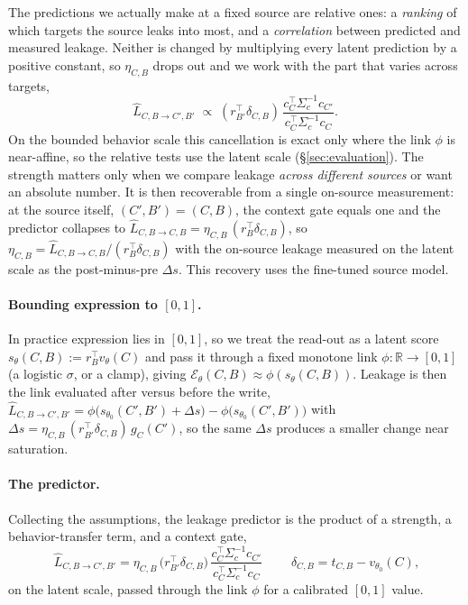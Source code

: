 \documentclass[11pt]{article}
\theoremstyle{definition}
\theoremstyle{definition}
\theoremstyle{assumptionstyle}
\newcounter{prediction}
\newcommand{\Expr}{\mathcal{E}}        %
\newcommand{\R}{\mathbb{R}}
\newcommand{\disp}{\delta_{C,B}}
\begin{document}
The predictions we actually make at a fixed source are relative ones: a \emph{ranking} of
which targets the source leaks into most, and a \emph{correlation} between predicted and
measured leakage. Neither is changed by multiplying every latent prediction by a positive
constant, so \(\eta_{C,B}\) drops out and we work with the part that varies across
targets,
\[
\widehat L_{C,B\to C',B'}
\;\propto\;
(r_{B'}^\top \disp)\,
\frac{c_{C}^\top \Sigma_c^{-1}c_{C'}}{c_{C}^\top \Sigma_c^{-1}c_{C}}.
\]
On the bounded behavior scale this cancellation is exact only where the link $\phi$ is near-affine, so the relative tests use the latent scale (\S\ref{sec:evaluation}). The strength matters only when we compare leakage \emph{across different sources} or want
an absolute number. It is then recoverable from a single on-source measurement: at the source
itself, \((C',B')=(C,B)\), the context gate equals one and the predictor collapses
to \(\widehat L_{C,B\to C,B}=\eta_{C,B}\,(r_B^\top\disp)\), so
\(\eta_{C,B}=\widehat L_{C,B\to C,B}/(r_B^\top\disp)\) with the on-source leakage
measured on the latent scale as the post-minus-pre $\Delta s$. This recovery uses the fine-tuned source model.


\paragraph{Bounding expression to $[0,1]$.} In practice expression lies in
$[0,1]$, so we treat the read-out as a latent score
$s_\theta(C,B):=r_B^\top v_\theta(C)$ and pass it through a fixed monotone
link $\phi:\R\to[0,1]$ (a logistic $\sigma$, or a clamp), giving
$\Expr_\theta(C,B)\approx\phi(s_\theta(C,B))$. Leakage is then the link
evaluated after versus before the write,
$\widehat L_{C,B\to C',B'}=\phi\!\big(s_{\theta_0}(C',B')+\Delta s\big)-\phi\!\big(s_{\theta_0}(C',B')\big)$
with $\Delta s=\eta_{C,B}\,(r_{B'}^\top \disp)\,g_{C}(C')$, so the same
$\Delta s$ produces a smaller change near saturation.

\paragraph{The predictor.} Collecting the assumptions, the leakage predictor is the
product of a strength, a behavior-transfer term, and a context gate,
\[
\boxed{\;
\widehat L_{C,B\to C',B'}
=
\eta_{C,B}\,
\big(r_{B'}^\top \delta_{C,B}\big)\,
\frac{c_{C}^\top \Sigma_c^{-1}c_{C'}}{c_{C}^\top \Sigma_c^{-1}c_{C}}
\;}
\qquad
\delta_{C,B}=t_{C,B}-v_{\theta_0}(C),
\]
on the latent scale, passed through the link $\phi$ for a calibrated $[0,1]$ value.
\end{document}
